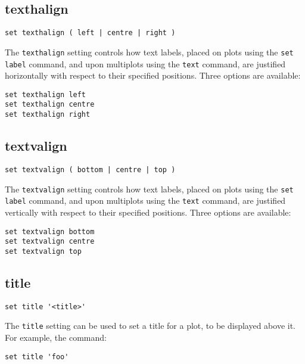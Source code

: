 \subsection{texthalign}

\begin{verbatim}
set texthalign ( left | centre | right )
\end{verbatim}

The {\tt texthalign} setting controls how text labels, placed on plots using the
{\tt set label} command, and upon multiplots using the {\tt text} command, are
justified horizontally with respect to their specified positions. Three options
are available:

\begin{verbatim}
set texthalign left
set texthalign centre
set texthalign right
\end{verbatim}

\subsection{textvalign}

\begin{verbatim}
set textvalign ( bottom | centre | top )
\end{verbatim}

The {\tt textvalign} setting controls how text labels, placed on plots using the
{\tt set label} command, and upon multiplots using the {\tt text} command, are
justified vertically with respect to their specified positions. Three options
are available:

\begin{verbatim}
set textvalign bottom 
set textvalign centre
set textvalign top
\end{verbatim}

\subsection{title}

\begin{verbatim}
set title '<title>'
\end{verbatim}

The {\tt title} setting can be used to set a title for a plot, to be displayed
above it.  For example, the command:

\begin{verbatim}
set title 'foo'
\end{verbatim}

